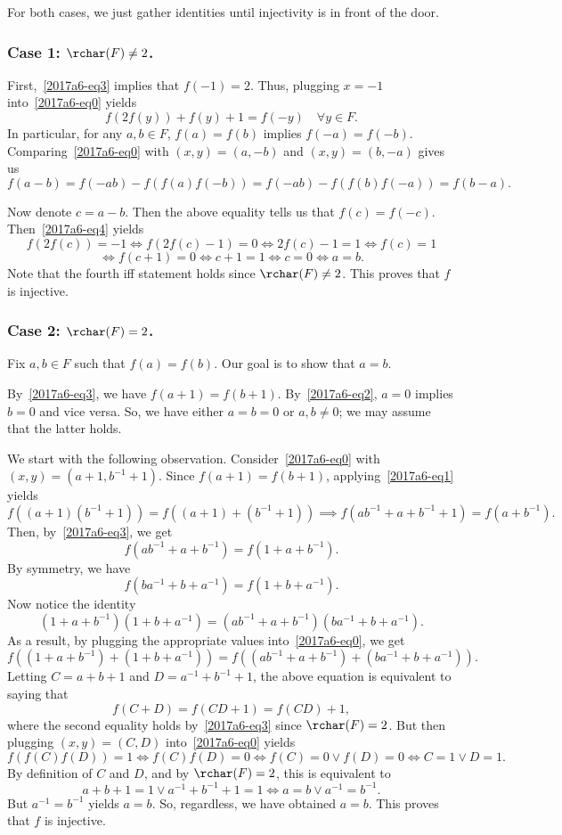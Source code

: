 For both cases, we just gather identities until injectivity is in front of the door.



\subsubsection*{Case 1: $\rchar(F) \neq 2$.}

First,~\eqref{2017a6-eq3} implies that $f(-1) = 2$.
Thus, plugging $x = -1$ into~\eqref{2017a6-eq0} yields
\[ f(2f(y)) + f(y) + 1 = f(-y) \quad \forall y \in F. \tag{4}\label{2017a6-eq4} \]
In particular, for any $a, b \in F$, $f(a) = f(b)$ implies $f(-a) = f(-b)$.
Comparing~\eqref{2017a6-eq0} with $(x, y) = (a, -b)$ and $(x, y) = (b, -a)$ gives us
\[ f(a - b) = f(-ab) - f(f(a) f(-b)) = f(-ab) - f(f(b) f(-a)) = f(b - a). \]

Now denote $c = a - b$.
Then the above equality tells us that $f(c) = f(-c)$.
Then~\eqref{2017a6-eq4} yields
\[ f(2f(c)) = -1 \iff f(2f(c) - 1) = 0 \iff 2f(c) - 1 = 1 \iff f(c) = 1 \]
\[ \iff f(c + 1) = 0 \iff c + 1 = 1 \iff c = 0 \iff a = b. \]
Note that the fourth iff statement holds since $\rchar(F) \neq 2$.
This proves that $f$ is injective.



\subsubsection*{Case 2: $\rchar(F) = 2$.}

Fix $a, b \in F$ such that $f(a) = f(b)$.
Our goal is to show that $a = b$.

By~\eqref{2017a6-eq3}, we have $f(a + 1) = f(b + 1)$.
By~\eqref{2017a6-eq2}, $a = 0$ implies $b = 0$ and vice versa.
So, we have either $a = b = 0$ or $a, b \neq 0$; we may assume that the latter holds.

We start with the following observation.
Consider~\eqref{2017a6-eq0} with $(x, y) = (a + 1, b^{-1} + 1)$.
Since $f(a + 1) = f(b + 1)$, applying~\eqref{2017a6-eq1} yields
\[ f((a + 1)(b^{-1} + 1)) = f((a + 1) + (b^{-1} + 1)) \implies f(ab^{-1} + a + b^{-1} + 1) = f(a + b^{-1}). \]
Then, by~\eqref{2017a6-eq3}, we get
\[ f(ab^{-1} + a + b^{-1}) = f(1 + a + b^{-1}). \]
By symmetry, we have
\[ f(ba^{-1} + b + a^{-1}) = f(1 + b + a^{-1}). \]
Now notice the identity
\[ (1 + a + b^{-1})(1 + b + a^{-1}) = (ab^{-1} + a + b^{-1})(ba^{-1} + b + a^{-1}). \]
As a result, by plugging the appropriate values into~\eqref{2017a6-eq0}, we get
\[ f((1 + a + b^{-1}) + (1 + b + a^{-1})) = f((ab^{-1} + a + b^{-1}) + (ba^{-1} + b + a^{-1})). \]
Letting $C = a + b + 1$ and $D = a^{-1} + b^{-1} + 1$, the above equation is equivalent to saying that
\[ f(C + D) = f(CD + 1) = f(CD) + 1, \]
    where the second equality holds by~\eqref{2017a6-eq3} since $\rchar(F) = 2$.
But then plugging $(x, y) = (C, D)$ into~\eqref{2017a6-eq0} yields
\[ f(f(C) f(D)) = 1 \iff f(C) f(D) = 0 \iff f(C) = 0 \vee f(D) = 0 \iff C = 1 \vee D = 1. \]
By definition of $C$ and $D$, and by $\rchar(F) = 2$, this is equivalent to
\[ a + b + 1 = 1 \vee a^{-1} + b^{-1} + 1 = 1 \iff a = b \vee a^{-1} = b^{-1}. \]
But $a^{-1} = b^{-1}$ yields $a = b$.
So, regardless, we have obtained $a = b$.
This proves that $f$ is injective.



